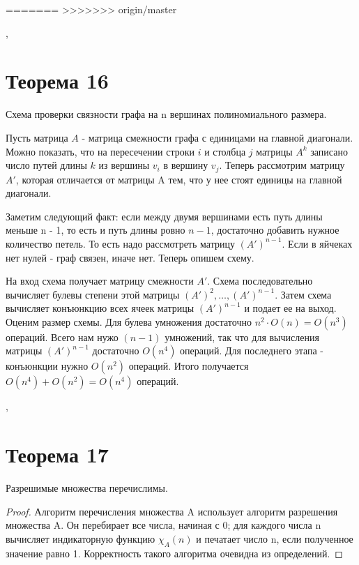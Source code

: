 \documentclass[a4paper,12pt]{article}
\begin{document}
=======
>>>>>>> origin/master
    
    \sep
    
    \section{Теорема 16}
    Схема проверки связности графа на n вершинах полиномиального размера.
    
    
    Пусть матрица $A$ - матрица смежности графа с единицами на главной диагонали.
    Можно показать, что на пересечении строки $i$ и столбца $j$ матрицы $A^{k}$
    записано число путей длины $k$ из вершины $v_i$ в вершину $v_j$.
    Теперь рассмотрим матрицу $A'$, которая отличается от матрицы A тем, что
    у нее стоят единицы на главной диагонали.
    
    Заметим следующий факт: если между двумя вершинами есть путь длины меньше n - 1,
    то есть и путь длины
    ровно $n-1$, достаточно добавить нужное количество петель. То есть надо рассмотреть
    матрицу $(A')^{n-1}$. Если в яйчеках нет нулей - граф связен, иначе нет. Теперь
    опишем схему.
    
    На вход схема получает матрицу смежности $A'$. Схема последовательно
    вычисляет булевы степени этой матрицы $(A')^2,\ldots,(A')^{n-1}$. Затем
    схема вычисляет конъюнкцию всех ячеек матрицы $(A')^{n-1}$ и подает ее на выход.\\
    
    Оценим размер схемы. Для булева умножения достаточно $n^2\cdot O(n) = O(n^3)$
    операций. Всего нам нужо $(n-1)$ умножений, так что для вычисления матрицы $(A')^{n-1}$
    достаточно $O(n^4)$ операций. Для последнего этапа - конъюнкции нужно $O(n^2)$
    операций. Итого получается $O(n^4)+O(n^2) = O(n^4)$ операций.
    
    \sep
    \section{Теорема 17}
    \begin{theorem}
        Разрешимые множества перечислимы.
    \end{theorem}
    \begin{proof}
    Алгоритм перечисления множества A использует алгоритм разрешения множества A.
    Он перебирает все числа, начиная с 0; для каждого числа n вычисляет индикаторную
    функцию $\chi_A(n)$ и печатает число n, если полученное значение равно 1.
    Корректность такого алгоритма очевидна из определений.
    \end{proof}
\end{document}
